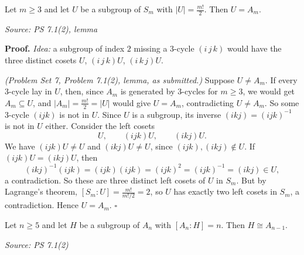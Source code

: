 \documentclass[11pt]{report}
\renewenvironment{proof}[1][Proof]{\noindent\textbf{#1.} }{\hfill$\square$\par\vspace{5pt}}
\newcommand{\srcline}[1]{\par\hfill{\footnotesize\textit{Source: #1}}}
\begin{document}
\begin{lembox}\label{lem:index-two-sm}
Let $m \geq 3$ and let $U$ be a subgroup of $S_m$ with $|U| = \frac{m!}{2}$. Then $U = A_m$.
\srcline{PS 7.1(2), lemma}
\end{lembox}

\begin{proof}
\textit{Idea:} a subgroup of index $2$ missing a $3$-cycle $(i\,j\,k)$ would have the three distinct cosets $U$, $(i\,j\,k)U$, $(i\,k\,j)U$.\par
\textit{(Problem Set 7, Problem 7.1(2), lemma, as submitted.)} Suppose $U \neq A_m$. If every $3$-cycle lay in $U$, then, since $A_m$ is generated by $3$-cycles for $m \geq 3$, we would get $A_m \subseteq U$, and $|A_m| = \frac{m!}{2} = |U|$ would give $U = A_m$, contradicting $U \neq A_m$. So some $3$-cycle $(ijk)$ is not in $U$. Since $U$ is a subgroup, its inverse $(ikj) = (ijk)^{-1}$ is not in $U$ either. Consider the left cosets
\[
U, \qquad (ijk)U, \qquad (ikj)U.
\]
We have $(ijk)U \neq U$ and $(ikj)U \neq U$, since $(ijk), (ikj) \notin U$. If $(ijk)U = (ikj)U$, then
\[
(ikj)^{-1}(ijk) = (ijk)(ijk) = (ijk)^2 = (ijk)^{-1} = (ikj) \in U,
\]
a contradiction. So these are three distinct left cosets of $U$ in $S_m$. But by Lagrange's theorem, $[S_m : U] = \frac{m!}{m!/2} = 2$, so $U$ has exactly two left cosets in $S_m$, a contradiction. Hence $U = A_m$.
\end{proof}

\begin{propbox}\label{prop:an-index-n}
Let $n \geq 5$ and let $H$ be a subgroup of $A_n$ with $[A_n : H] = n$. Then $H \cong A_{n-1}$.
\srcline{PS 7.1(2)}
\end{propbox}
\end{document}
